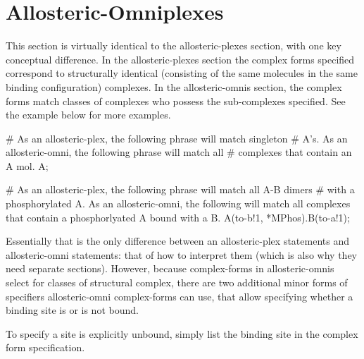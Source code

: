 \section{Allosteric-Omniplexes}
This section is virtually identical to the allosteric-plexes section,
with one key conceptual difference.  In the allosteric-plexes section
the complex forms specified correspond to structurally identical
(consisting of the same molecules in the same binding configuration)
complexes.  In the allosteric-omnis section, the complex forms match
classes of complexes who possess the sub-complexes specified.  See the
example below for more examples.


\begin{ExampleMZR}

# As an allosteric-plex, the following phrase will match singleton
# A's.  As an allosteric-omni, the following phrase will match all
# complexes that contain an A mol.
A; 

# As an allosteric-plex, the following phrase will match all A-B dimers 
# with a phosphorylated A.  As an allosteric-omni, the following will
match all complexes that contain a phosphorlyated A bound with a B.
A(to-b!1, *M{Phos}).B(to-a!1);

\end{ExampleMZR}

Essentially that is the only difference between an allosteric-plex
statements and allosteric-omni statements: that of how to interpret
them (which is also why they need separate sections).  However,
because complex-forms in allosteric-omnis select for classes of
structural complex, there are two additional minor forms of
specifiers allosteric-omni complex-forms can use, that allow specifying
whether a binding site is or is not bound.  

To specify a site is explicitly unbound, simply list the binding site in the
complex form specification.

